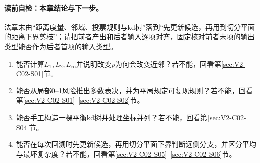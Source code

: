\paragraph{读前自检：本章结论与下一步。}\kNN{}法章末由“距离度量、邻域、投票规则与kd树”落到“先更新候选，再用到切分平面的距离下界剪枝”；请把前者产出和后者输入逐项对齐，固定核对前者末项的输出类型能否作为后者首项的输入类型。\par

\begin{SLCompactClosure}
\label{struct:V2-C02-CH36}

\label{struct:V2-C02-CH37}
\begin{selfcheckbox}
\begin{enumerate}[leftmargin=2.2em]
  \item 能否计算$L_1,L_2,L_\infty$并说明改变$p$为何会改变近邻？若不能，回看第\ref{sec:V2-C02-S01}节。
  \item 能否从局部0--1风险推出多数表决，并为平局规定可复现规则？若不能，回看第\ref{sec:V2-C02-S01}--\ref{sec:V2-C02-S02}节。
  \item 能否手工构造一棵平衡kd树并处理坐标并列？若不能，回看第\ref{sec:V2-C02-S04}节。
  \item 能否在每次回溯时先更新候选，再用切分平面下界判断远侧分支，并区分平均与最坏复杂度？若不能，回看第\ref{sec:V2-C02-S05}--\ref{sec:V2-C02-S06}节。
\end{enumerate}
\end{selfcheckbox}
\end{SLCompactClosure}
